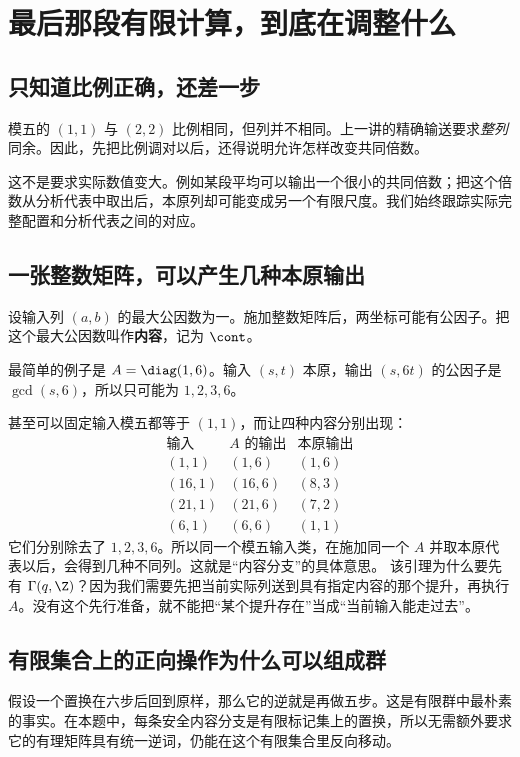 \chapter{最后那段有限计算，到底在调整什么}\label{sec:controllers}
\section{只知道比例正确，还差一步}
模五的 $(1,1)$ 与 $(2,2)$ 比例相同，但列并不相同。上一讲的精确输送要求\emph{整列}同余。因此，先把比例调对以后，还得说明允许怎样改变共同倍数。

这不是要求实际数值变大。例如某段平均可以输出一个很小的共同倍数；把这个倍数从分析代表中取出后，本原列却可能变成另一个有限尺度。我们始终跟踪实际完整配置和分析代表之间的对应。

\section{一张整数矩阵，可以产生几种本原输出}
设输入列 $(a,b)$ 的最大公因数为一。施加整数矩阵后，两坐标可能有公因子。把这个最大公因数叫作\textbf{内容}，记为 $\cont$。

最简单的例子是 $A=\diag(1,6)$。输入 $(s,t)$ 本原，输出 $(s,6t)$ 的公因子是 $\gcd(s,6)$，所以只可能为 $1,2,3,6$。

甚至可以固定输入模五都等于 $(1,1)$，而让四种内容分别出现：
\[
\begin{array}{c|c|c}
\text{输入}&A\text{ 的输出}&\text{本原输出}\\ \hline
(1,1)&(1,6)&(1,6)\\
(16,1)&(16,6)&(8,3)\\
(21,1)&(21,6)&(7,2)\\
(6,1)&(6,6)&(1,1)
\end{array}
\]
它们分别除去了 $1,2,3,6$。所以同一个模五输入类，在施加同一个 $A$ 并取本原代表以后，会得到几种不同列。这就是“内容分支”的具体意思。
该引理为什么要先有 $\Gamma(q,\Z)$？因为我们需要先把当前实际列送到具有指定内容的那个提升，再执行 $A$。没有这个先行准备，就不能把“某个提升存在”当成“当前输入能走过去”。

\section{有限集合上的正向操作为什么可以组成群}
假设一个置换在六步后回到原样，那么它的逆就是再做五步。这是有限群中最朴素的事实。在本题中，每条安全内容分支是有限标记集上的置换，所以无需额外要求它的有理矩阵具有统一逆词，仍能在这个有限集合里反向移动。

